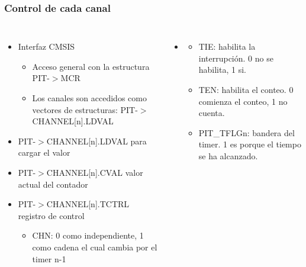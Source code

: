 \documentclass[10.5pt,scale=1.0,t,aspectratio=169,hyperref={pdfpagelabels=false}]{beamer}
\begin{document}
\begin{frame}
	\frametitle{Control de cada canal }
	{\small
		\begin{columns}
			\begin{itemize}
				\item  Interfaz CMSIS
				\begin{itemize}
					\item Acceso general con la estructura PIT-$>$MCR
					\item Los canales son accedidos como vectores de estructuras: PIT-$>$CHANNEL[n].LDVAL
				\end{itemize}
				\item PIT-$>$CHANNEL[n].LDVAL para cargar el valor
				\item PIT-$>$CHANNEL[n].CVAL valor actual del contador
				\item PIT-$>$CHANNEL[n].TCTRL registro de control
				\begin{itemize}
					\item CHN: 0 como independiente, 1 como cadena el cual cambia por el timer n-1
				\end{itemize}
			\end{itemize}
			
			\begin{itemize}
				\item[] \begin{itemize}
					\item TIE: habilita la interrupción. 0 no se habilita, 1 si.
					\item TEN: habilita el conteo. 0 comienza el conteo, 1 no cuenta.
					\item PIT\_TFLGn: bandera del timer. 1 es porque el tiempo se ha alcanzado. 
				\end{itemize}
			\end{itemize}
			
		\end{columns}
	}
\end{frame}
\end{document}
